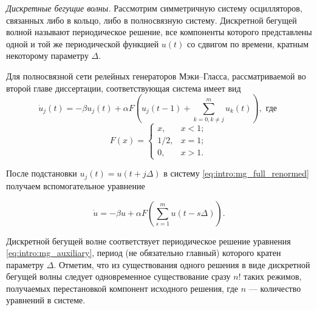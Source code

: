 \textit{Дискретные бегущие волны.} Рассмотрим симметричную систему осцилляторов, связанных либо в кольцо, либо в полносвязную систему. Дискретной бегущей волной называют периодическое решение, все компоненты которого представлены одной и той же периодической функцией $u(t)$ со сдвигом по времени, кратным некоторому параметру $\Delta$.


Для полносвязной сети релейных генераторов Мэки--Гласса, рассматриваемой во второй главе диссертации, соответствующая система имеет вид
%
\begin{equation}
	\label{eq:intro:mg_full_renormed}
	\dot{u}_j(t) = -\beta u_j(t) + \alpha F \left(u_j(t - 1) + \sum\limits_{k = 0, k\neq j}^m u_k(t)\right), \text{ где }
\end{equation}
\[
F(x) = \begin{cases}
	x, & x < 1;\\
	1/2, & x = 1;\\
	0, & x > 1.
\end{cases}
\]

После подстановки $u_j(t) = u(t + j\Delta)$ в систему \eqref{eq:intro:mg_full_renormed} получаем вспомогательное уравнение

\begin{equation}
	\label{eq:intro:mg_auxiliary}
	\dot{u}=-\beta u + \alpha F\left(\sum_{s=1}^{m}u(t-s\Delta)\right).
\end{equation}

Дискретной бегущей волне соответствует периодическое решение уравнения \eqref{eq:intro:mg_auxiliary}, период (не обязательно главный) которого кратен параметру $\Delta$. Отметим, что из существования одного решения в виде дискретной бегущей волны следует одновременное существование сразу $n!$ таких режимов, получаемых перестановкой компонент исходного решения, где $n$ --- количество уравнений в системе.


